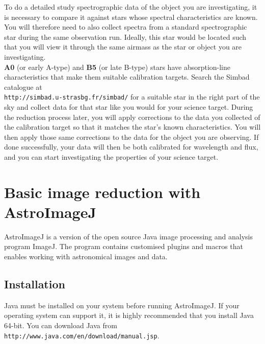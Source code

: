 \documentclass[12pt,twoside,a4paper]{report}
\begin{document}
To do a detailed study spectrographic data of the object you are investigating, it is necessary to compare it against stars whose spectral characteristics are known. You will therefore need to also collect spectra from a standard spectrographic star during the same observation run. Ideally, this star would be located such that you will view it through the same airmass as the star or object you are investigating.\\

\textbf{A0} (or early A-type) and \textbf{B5} (or late B-type) stars have absorption-line characteristics that make them suitable calibration targets. Search the Simbad catalogue at \\ {\tt http://simbad.u-strasbg.fr/simbad/} for a suitable star in the right part of the sky and collect data for that star like you would for your science target. During the reduction process later, you will apply corrections to the data you collected of the calibration target so that it matches the star's known characteristics. You will then apply those same corrections to the data for the object you are observing. If done successfully, your data will then be both calibrated for wavelength and flux, and you can start investigating the properties of your science target.





\chapter{Basic image reduction with AstroImageJ}

AstroImageJ is a version of the open source Java image processing and analysis program ImageJ. The program contains customised plugins and macros that enables working with astronomical images and data.

\section{Installation}
Java must be installed on your system before running AstroImageJ. If your operating system can support it, it is highly recommended that you install Java 64-bit. You can download Java from {\tt http://www.java.com/en/download/manual.jsp}.\\
\end{document}
